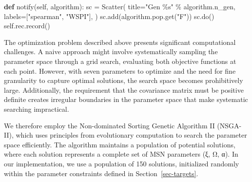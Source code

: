 \documentclass[
  authoryear,
  preprint,
  3p]{elsarticle}
\newenvironment{Shaded}{\begin{snugshade}}{\end{snugshade}}
\newcommand{\KeywordTok}[1]{\textcolor[rgb]{0.00,0.23,0.31}{\textbf{#1}}}
\newcommand{\NormalTok}[1]{\textcolor[rgb]{0.00,0.23,0.31}{#1}}
\newcommand{\OperatorTok}[1]{\textcolor[rgb]{0.37,0.37,0.37}{#1}}
\newcommand{\SpecialCharTok}[1]{\textcolor[rgb]{0.37,0.37,0.37}{#1}}
\newcommand{\StringTok}[1]{\textcolor[rgb]{0.13,0.47,0.30}{#1}}
\newcommand{\VariableTok}[1]{\textcolor[rgb]{0.07,0.07,0.07}{#1}}
\begin{document}
\begin{Shaded}
\begin{Highlighting}[]
    \KeywordTok{def}\NormalTok{ notify(}\VariableTok{self}\NormalTok{, algorithm):}
\NormalTok{        sc }\OperatorTok{=}\NormalTok{ Scatter(}
\NormalTok{            title}\OperatorTok{=}\StringTok{"Gen }\SpecialCharTok{\%s}\StringTok{"} \OperatorTok{\%}\NormalTok{ algorithm.n\_gen,}
\NormalTok{            labels}\OperatorTok{=}\NormalTok{[}\StringTok{"spearman"}\NormalTok{, }\StringTok{"WSPI"}\NormalTok{],}
\NormalTok{        )}
\NormalTok{        sc.add(algorithm.pop.get(}\StringTok{"F"}\NormalTok{))}
\NormalTok{        sc.do()}
        \VariableTok{self}\NormalTok{.rec.record()}
\end{Highlighting}
\end{Shaded}

The optimization problem described above presents significant
computational challenges. A naive approach might involve systematically
sampling the parameter space through a grid search, evaluating both
objective functions at each point. However, with seven parameters to
optimize and the need for fine granularity to capture optimal solutions,
the search space becomes prohibitively large. Additionally, the
requirement that the covariance matrix must be positive definite creates
irregular boundaries in the parameter space that make systematic
searching impractical.

We therefore employ the Non-dominated Sorting Genetic Algorithm II
(NSGA-II), which uses principles from evolutionary computation to search
the parameter space efficiently. The algorithm maintains a population of
potential solutions, where each solution represents a complete set of
MSN parameters (ξ, Ω, α). In our implementation, we use a population of
150 solutions, initialized randomly within the parameter constraints
defined in Section~\ref{sec-targets}.
\end{document}

